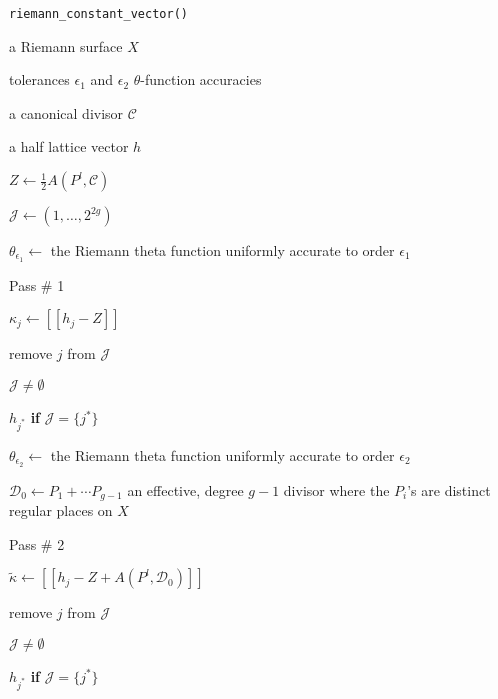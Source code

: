 \documentclass[12]{article}
\begin{document}
\begin{algorithm}
\caption{\tt riemann\_constant\_vector()}
\label{alg: rcv}
\begin{algorithmic}[1]

\Require a Riemann surface $X$

\Require tolerances $\epsilon_1$ and $\epsilon_2$ \Comment
$\theta$-function accuracies

\Require a canonical divisor $\mathcal{C}$

\Ensure a half lattice vector $h$

\State $Z \gets \tfrac{1}{2} A(P^l, \mathcal{C})$

\State $\mathcal{J} \gets \left( 1, \ldots, 2^{2g} \right)$

\State $\theta_{\epsilon_1} \gets$ the Riemann theta function uniformly
accurate to order $\epsilon_1$

 \Comment Pass \# 1

    \State $\kappa_j \gets [[h_j - Z]]$


        \State remove $j$ from $\mathcal{J}$

    \EndIf

\EndFor

 $\mathcal{J} \neq \emptyset$

 $h_{j^*}$ {\bf if} $\mathcal{J} = \{j^*\}$

\State $\theta_{\epsilon_2} \gets$ the Riemann theta function uniformly
accurate to order $\epsilon_2$

\State $\mathcal{D}_0 \gets P_1 + \cdots P_{g-1}$ an effective, degree
$g-1$ divisor where the $P_i$'s are distinct regular places on $X$

 \Comment Pass \# 2

    \State $\tilde{\kappa} \gets [[ h_j - Z + A(P^l, \mathcal{D}_0) ]]$


        \State remove $j$ from $\mathcal{J}$

    \EndIf

\EndFor

 $\mathcal{J} \neq \emptyset$

 $h_{j^*}$ {\bf if} $\mathcal{J} = \{j^*\}$


\end{algorithmic}
\end{algorithm}



\end{document}
